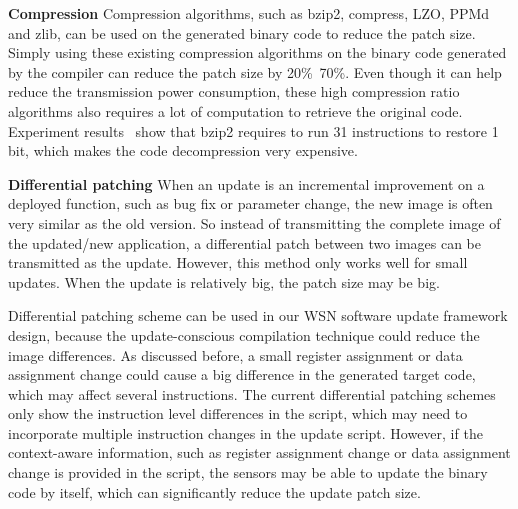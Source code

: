 \textbf{Compression}
Compression algorithms, such as bzip2, compress, LZO, PPMd and zlib, can be used on the generated binary code to reduce the patch size. Simply using these existing compression algorithms on the binary code generated by the compiler can reduce the patch size by 20\%~70\%. Even though it can help reduce the transmission power consumption, these high compression ratio algorithms also requires a lot of computation to retrieve the original code. Experiment results~\cite{related:barr-energy} show that bzip2 requires to run 31 instructions to restore 1 bit, which makes the code decompression very expensive.

\textbf{Differential patching}
When an update is an incremental improvement on a deployed function, such as bug fix or parameter change, the new image is often very similar as the old version. So instead of transmitting the complete image of the updated/new application, a differential patch between two images can be transmitted as the update. 
However, this method only works well for small updates. When the update is relatively big, the patch size may be big.

Differential patching scheme can be used in our WSN software update framework design, because the update-conscious compilation technique could reduce the image differences. As discussed before, a small register assignment or data assignment change could cause a big difference in the generated target code, which may affect several instructions. The current differential patching schemes only show the instruction level differences in the script, which may need to incorporate multiple instruction changes in the update script. However, if the context-aware information, such as register assignment change or data assignment change is provided in the script, the sensors may be able to update the binary code by itself, which can significantly reduce the update patch size.

